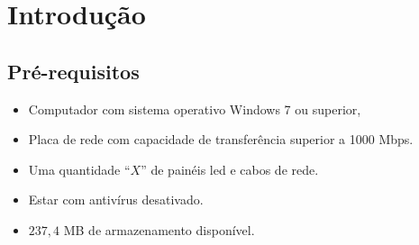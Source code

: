 \documentclass[12pt, a4paper]{article}
\begin{document}
	\section{Introdução}\label{Introdução}
	\subsection{Pré-requisitos}\label{Pré-requisitos}
	\begin{itemize}
		\item Computador com sistema operativo Windows 7 ou superior,	
		\item Placa de rede com capacidade de transferência superior a 1000 Mbps.
		\item Uma quantidade ``$X$'' de painéis led e cabos de rede.
		\item Estar com antivírus desativado.
		\item $237,4$ MB de armazenamento disponível.
	\end{itemize}
\end{document}
